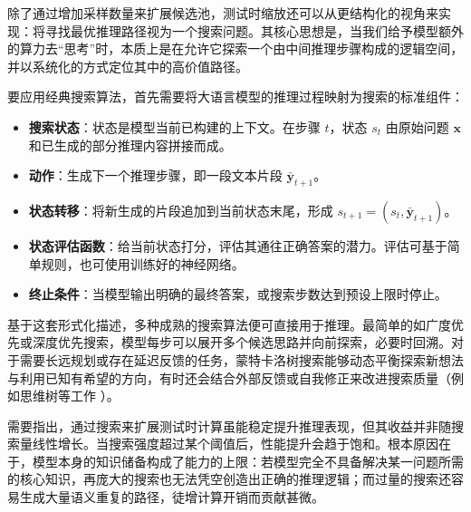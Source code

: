 除了通过增加采样数量来扩展候选池，测试时缩放还可以从更结构化的视角来实现：将寻找最优推理路径视为一个搜索问题。其核心思想是，当我们给予模型额外的算力去“思考”时，本质上是在允许它探索一个由中间推理步骤构成的逻辑空间，并以系统化的方式定位其中的高价值路径。

要应用经典搜索算法，首先需要将大语言模型的推理过程映射为搜索的标准组件：

\begin{itemize}
  \item \textbf{搜索状态}：状态是模型当前已构建的上下文。在步骤 $t$，状态 $s_t$ 由原始问题 $\mathbf{x}$ 和已生成的部分推理内容拼接而成。
  \item \textbf{动作}：生成下一个推理步骤，即一段文本片段 $\bar{\mathbf{y}}_{t+1}$。
  \item \textbf{状态转移}：将新生成的片段追加到当前状态末尾，形成 $s_{t+1} = (s_t, \bar{\mathbf{y}}_{t+1})$。
  \item \textbf{状态评估函数}：给当前状态打分，评估其通往正确答案的潜力。评估可基于简单规则，也可使用训练好的神经网络。
  \item \textbf{终止条件}：当模型输出明确的最终答案，或搜索步数达到预设上限时停止。
\end{itemize}

基于这套形式化描述，多种成熟的搜索算法便可直接用于推理。最简单的如广度优先或深度优先搜索，模型每步可以展开多个候选思路并向前探索，必要时回溯。对于需要长远规划或存在延迟反馈的任务，蒙特卡洛树搜索能够动态平衡探索新想法与利用已知有希望的方向，有时还会结合外部反馈或自我修正来改进搜索质量（例如思维树等工作 \cite{yao-etal:2024tree}）。

需要指出，通过搜索来扩展测试时计算虽能稳定提升推理表现，但其收益并非随搜索量线性增长。当搜索强度超过某个阈值后，性能提升会趋于饱和。根本原因在于，模型本身的知识储备构成了能力的上限：若模型完全不具备解决某一问题所需的核心知识，再庞大的搜索也无法凭空创造出正确的推理逻辑；而过量的搜索还容易生成大量语义重复的路径，徒增计算开销而贡献甚微。




